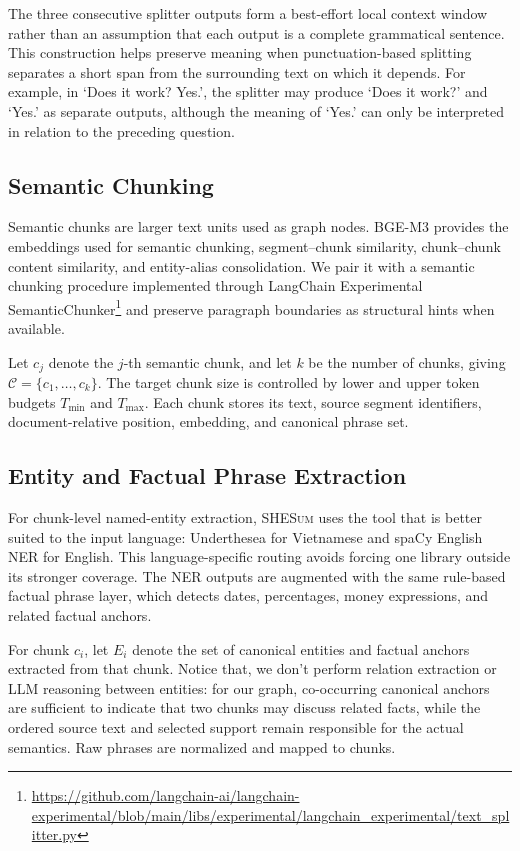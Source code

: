\documentclass[11pt]{article}
\newcommand{\methodname}{\textsc{SHESum}}
\begin{document}
The three consecutive splitter outputs form a best-effort local context window rather than an assumption that each output is a complete grammatical sentence. This construction helps preserve meaning when punctuation-based splitting separates a short span from the surrounding text on which it depends. For example, in `Does it work? Yes.', the splitter may produce `Does it work?' and `Yes.' as separate outputs, although the meaning of `Yes.' can only be interpreted in relation to the preceding question.


\subsection{Semantic Chunking}

Semantic chunks are larger text units used as graph nodes. BGE-M3 \citep{bge_m3} provides the embeddings used for semantic chunking, segment--chunk similarity, chunk--chunk content similarity, and entity-alias consolidation. We pair it with a semantic chunking procedure implemented through LangChain Experimental SemanticChunker\footnote{\url{https://github.com/langchain-ai/langchain-experimental/blob/main/libs/experimental/langchain_experimental/text_splitter.py}} and preserve paragraph boundaries as structural hints when available. 

Let $c_j$ denote the $j$-th semantic chunk, and let $k$ be the number of chunks, giving $\mathcal{C}=\{c_1,\ldots,c_k\}$. The target chunk size is controlled by lower and upper token budgets $T_{\min}$ and $T_{\max}$. Each chunk stores its text, source segment identifiers, document-relative position, embedding, and canonical phrase set.

\subsection{Entity and Factual Phrase Extraction}

For chunk-level named-entity extraction, \methodname{} uses the tool that is better suited to the input language: Underthesea \citep{underthesea} for Vietnamese and spaCy English NER \citep{honnibal2020spacy} for English. This language-specific routing avoids forcing one library outside its stronger coverage. The NER outputs are augmented with the same rule-based factual phrase layer, which detects dates, percentages, money expressions, and related factual anchors. 

For chunk $c_i$, let $E_i$ denote the set of canonical entities and factual anchors extracted from that chunk. Notice that, we don't perform relation extraction or LLM reasoning between entities: for our graph, co-occurring canonical anchors are sufficient to indicate that two chunks may discuss related facts, while the ordered source text and selected support remain responsible for the actual semantics. Raw phrases are normalized and mapped to chunks.
\end{document}
